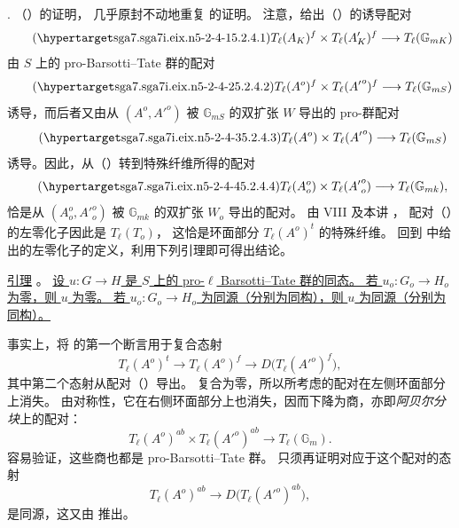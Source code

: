 \smallskip
\noindent
{}. （）的证明，
几乎原封不动地重复  的证明。
注意，给出（）的诱导配对
\begin{equation}\tag{\SGARefTarget{sga7.sga7i.eix.n5-2-4-1}{5.2.4.1}}
 T_\ell(A_K)^f\times T_\ell(A'_K)^f
 \longrightarrow T_\ell(\mathbb G_{mK})
\end{equation}
由 $S$ 上的 pro-Barsotti--Tate 群的配对
\begin{equation}\tag{\SGARefTarget{sga7.sga7i.eix.n5-2-4-2}{5.2.4.2}}
 T_\ell(A^o)^f\times T_\ell({A'}^o)^f
 \longrightarrow T_\ell(\mathbb G_{mS})
\end{equation}
诱导，而后者又由从 $(A^o,{A'}^o)$ 被 $\mathbb G_{mS}$ 的双扩张 $W$ 导出的 pro-群配对
\begin{equation}\tag{\SGARefTarget{sga7.sga7i.eix.n5-2-4-3}{5.2.4.3}}
 T_\ell(A^o)\times T_\ell({A'}^o)
 \longrightarrow T_\ell(\mathbb G_{mS})
\end{equation}
诱导。因此，从（）转到特殊纤维所得的配对
\begin{equation}\tag{\SGARefTarget{sga7.sga7i.eix.n5-2-4-4}{5.2.4.4}}
 T_\ell(A_o^o)\times T_\ell({A'}_o^o)
 \longrightarrow T_\ell(\mathbb G_{mk}),
\end{equation}
恰是从 $(A_o^o,{A'}_o^o)$ 被 $\mathbb G_{mk}$ 的双扩张 $W_o$ 导出的配对。
由 VIII  及本讲 ，
配对（）的左零化子因此是 $T_\ell(T_o)$，
这恰是环面部分 $T_\ell(A^o)^t$ 的特殊纤维。
回到  中给出的左零化子的定义，利用下列引理即可得出结论。

\medskip
\noindent
\underline{引理} 。
\underline{设 $u:G\longrightarrow H$ 是 $S$ 上的 pro-$\ell$ Barsotti--Tate 群的同态。
若 $u_o:G_o\longrightarrow H_o$ 为零，则 $u$ 为零。
若 $u_o:G_o\longrightarrow H_o$ 为同源（分别为同构），则 $u$ 为同源（分别为同构）。}

事实上，将  的第一个断言用于复合态射
\[
 T_\ell(A^o)^t
 \longrightarrow T_\ell(A^o)^f
 \longrightarrow D\bigl(T_\ell({A'}^o)^f\bigr),
\]
其中第二个态射从配对（）导出。
复合为零，所以所考虑的配对在左侧环面部分上消失。
由对称性，它在右侧环面部分上也消失，因而下降为商，亦即\emph{阿贝尔分块}上的配对：
\[
 T_\ell(A^o)^{ab}\times T_\ell({A'}^o)^{ab}
 \longrightarrow T_\ell(\mathbb G_m).
\]
容易验证，这些商也都是 pro-Barsotti--Tate 群。
只须再证明对应于这个配对的态射
\[
 T_\ell(A^o)^{ab}
 \longrightarrow D\bigl(T_\ell({A'}^o)^{ab}\bigr),
\]
是同源，这又由  推出。

